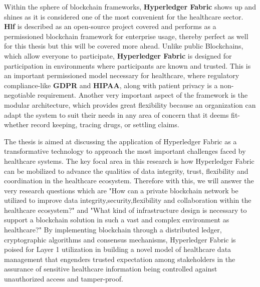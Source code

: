 Within the sphere of blockchain frameworks, \textbf{Hyperledger Fabric} shows up and shines as it is considered one of the most convenient for the healthcare sector. \textbf{Hlf} is described as an open-source project covered and performs as a permissioned blockchain framework for enterprise usage, thereby perfect as well for this thesis but this will be covered more ahead. Unlike public Blockchains, which allow everyone to participate, \textbf{Hyperledger Fabric} is designed for participation in environments where participants are known and trusted. This is an important permissioned model necessary for healthcare, where regulatory compliance-like \textbf{GDPR} and \textbf{HIPAA}, along with patient privacy is a non-negotiable requirement. Another very important aspect of the framework is the modular architecture, which provides great flexibility because an organization can adapt the system to suit their needs in any area of concern that it deems fit-whether record keeping, tracing drugs, or settling claims.

The thesis is aimed at discussing the application of Hyperledger Fabric as a transformative technology to approach the most important challenges faced by healthcare systems. The key focal area in this research is how Hyperledger Fabric can be mobilized to advance the qualities of data integrity, trust, flexibility and coordination in the healthcare ecosystem. Therefore with this, we will answer the very research questions which are "How can a private blockchain network be utilized to improve data integrity,security,flexibility and collaboration within the healthcare ecosystem?" and "What kind of infrastructure design is necessary to support a blockchain solution in such a vast and complex environment as healthcare?"  By implementing blockchain through a distributed ledger, cryptographic algorithms and consensus mechanisms, Hyperledger Fabric is poised for Layer 1 utilization in building a novel model of healthcare data management that engenders trusted expectation among stakeholders in the assurance of sensitive healthcare information being controlled against unauthorized access and tamper-proof.

